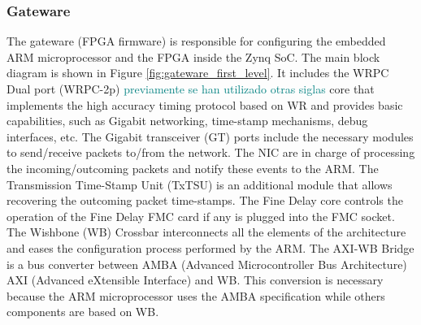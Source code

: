 \subsubsection{Gateware} \label{subsec:gateware}

The gateware (FPGA firmware) is responsible for configuring the embedded ARM
microprocessor and the FPGA inside the Zynq SoC. 
The main block diagram is shown in Figure \ref{fig:gateware_first_level}. 
It includes the WRPC Dual port (WRPC-2p) \textcolor{teal}{previamente se han 
utilizado otras siglas} core that implements the high accuracy timing protocol 
based on
WR and provides basic capabilities, such as Gigabit networking, time-stamp
mechanisms, debug interfaces, etc. The Gigabit transceiver (GT) ports include the
necessary modules to send/receive packets to/from the network. The NIC are in charge of processing the incoming/outcoming
packets and notify these events to the ARM. The Transmission Time-Stamp Unit
(TxTSU) is an additional module that allows recovering the outcoming packet
time-stamps. The Fine Delay core controls the operation of the Fine Delay FMC
card if any is plugged into the FMC socket. The Wishbone (WB) Crossbar
interconnects all the elements of the architecture and eases the configuration
process performed by the ARM. The AXI-WB Bridge is a bus converter between AMBA (Advanced Microcontroller Bus Architecture)
AXI (Advanced eXtensible Interface) and WB. This conversion is necessary because the ARM microprocessor
uses the AMBA specification while others components are based on WB.

